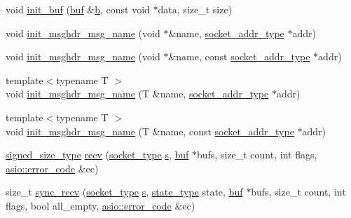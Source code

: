 \begin{DoxyCompactItemize}
\item 
void \hyperlink{namespaceasio_1_1detail_1_1socket__ops_a614b59d5731876b6af07f8d3ea5e052b}{init\+\_\+buf} (\hyperlink{namespaceasio_1_1detail_1_1socket__ops_aac19d854d021af5882325264a1833c65}{buf} \&\hyperlink{group__async__read_ga945a5c18fa77a9e2eba420f8f44b2a4f}{b}, const void $\ast$data, size\+\_\+t size)
\item 
void \hyperlink{namespaceasio_1_1detail_1_1socket__ops_ad407b17bbd4f0405e1ec2e1ae5f4752b}{init\+\_\+msghdr\+\_\+msg\+\_\+name} (void $\ast$\&name, \hyperlink{namespaceasio_1_1detail_a40a7b0385a38f87815ffbb8df5e34d05}{socket\+\_\+addr\+\_\+type} $\ast$addr)
\item 
void \hyperlink{namespaceasio_1_1detail_1_1socket__ops_a5ac22aed954e61ebb26ec23e2b3a8e2a}{init\+\_\+msghdr\+\_\+msg\+\_\+name} (void $\ast$\&name, const \hyperlink{namespaceasio_1_1detail_a40a7b0385a38f87815ffbb8df5e34d05}{socket\+\_\+addr\+\_\+type} $\ast$addr)
\item 
{\footnotesize template$<$typename T $>$ }\\void \hyperlink{namespaceasio_1_1detail_1_1socket__ops_a329d55c68d029e6d969b44477af1be17}{init\+\_\+msghdr\+\_\+msg\+\_\+name} (T \&name, \hyperlink{namespaceasio_1_1detail_a40a7b0385a38f87815ffbb8df5e34d05}{socket\+\_\+addr\+\_\+type} $\ast$addr)
\item 
{\footnotesize template$<$typename T $>$ }\\void \hyperlink{namespaceasio_1_1detail_1_1socket__ops_a8a41f252aeeef9953d7d8778a805a7f4}{init\+\_\+msghdr\+\_\+msg\+\_\+name} (T \&name, const \hyperlink{namespaceasio_1_1detail_a40a7b0385a38f87815ffbb8df5e34d05}{socket\+\_\+addr\+\_\+type} $\ast$addr)
\item 
\hyperlink{namespaceasio_1_1detail_a0912273eb9e5fcdaef1b12e9b77e9f07}{signed\+\_\+size\+\_\+type} \hyperlink{namespaceasio_1_1detail_1_1socket__ops_a6a6d856ecb3a3c20a7a92142a0ba9390}{recv} (\hyperlink{namespaceasio_1_1detail_a6798c771dd84b79798b1a08150706ea9}{socket\+\_\+type} \hyperlink{group__async__connect_ga31ab74b9ea6c77932dddd016cfc7920a}{s}, \hyperlink{namespaceasio_1_1detail_1_1socket__ops_aac19d854d021af5882325264a1833c65}{buf} $\ast$bufs, size\+\_\+t count, int flags, \hyperlink{classasio_1_1error__code}{asio\+::error\+\_\+code} \&ec)
\item 
size\+\_\+t \hyperlink{namespaceasio_1_1detail_1_1socket__ops_a0af2a4601b674348ed084aeb22bc21b1}{sync\+\_\+recv} (\hyperlink{namespaceasio_1_1detail_a6798c771dd84b79798b1a08150706ea9}{socket\+\_\+type} \hyperlink{group__async__connect_ga31ab74b9ea6c77932dddd016cfc7920a}{s}, \hyperlink{namespaceasio_1_1detail_1_1socket__ops_a5ce32ee297edef8833113ea35a933054}{state\+\_\+type} state, \hyperlink{namespaceasio_1_1detail_1_1socket__ops_aac19d854d021af5882325264a1833c65}{buf} $\ast$bufs, size\+\_\+t count, int flags, bool all\+\_\+empty, \hyperlink{classasio_1_1error__code}{asio\+::error\+\_\+code} \&ec)

\end{DoxyCompactItemize}
